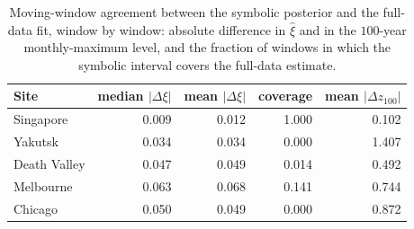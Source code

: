 \begin{table}[t]
\centering
\small
\caption{Moving-window agreement between the symbolic posterior and the full-data fit, window by window: absolute difference in $\hat\xi$ and in the $100$-year monthly-maximum level, and the fraction of windows in which the symbolic interval covers the full-data estimate.}
\label{tab:real-agreement}
\begin{tabular}{lrrrr}
\toprule
Site & median $|\Delta\xi|$ & mean $|\Delta\xi|$ & coverage & mean $|\Delta z_{100}|$ \\
\midrule
Singapore & 0.009 & 0.012 & 1.000 & 0.102 \\
Yakutsk & 0.034 & 0.034 & 0.000 & 1.407 \\
Death Valley & 0.047 & 0.049 & 0.014 & 0.492 \\
Melbourne & 0.063 & 0.068 & 0.141 & 0.744 \\
Chicago & 0.050 & 0.049 & 0.000 & 0.872 \\
\bottomrule
\end{tabular}
\end{table}
